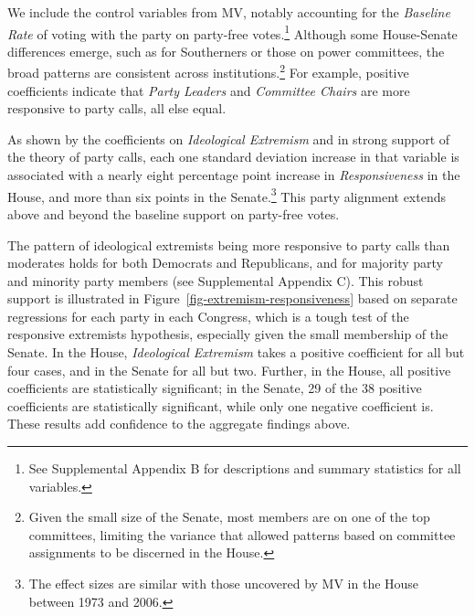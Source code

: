 \documentclass[12pt]{article}
\begin{document}
We include the control variables from MV, notably accounting for the \textit{Baseline Rate} of voting with the party on party-free votes.\footnote{\doublespacing\normalsize See Supplemental Appendix B for descriptions and summary statistics for all variables.}  Although some House-Senate differences emerge, such as for Southerners or those on power committees, the broad patterns are consistent across institutions.\footnote{\doublespacing\normalsize Given the small size of the Senate, most members are on one of the top committees, limiting the variance that allowed patterns based on committee assignments to be discerned in the House.}  For example, positive coefficients indicate that \textit{Party Leaders} and \textit{Committee Chairs} are more responsive to party calls, all else equal.

As shown by the coefficients on \textit{Ideological Extremism} and in strong support of the theory of party calls, each one standard deviation increase in that variable is associated with a nearly eight percentage point increase in \textit{Responsiveness} in the House, and more than six points in the Senate.\footnote{\doublespacing\normalsize The effect sizes are similar with those uncovered by MV in the House between 1973 and 2006.}  This party alignment extends above and beyond the baseline support on party-free votes.

The pattern of ideological extremists being more responsive to party calls than moderates holds for both Democrats and Republicans, and for majority party and minority party members (see Supplemental Appendix C). This robust support is illustrated in Figure~\ref{fig-extremism-responsiveness} based on separate regressions for each party in each Congress, which is a tough test of the responsive extremists hypothesis, especially given the small membership of the Senate. In the House, \textit{Ideological Extremism} takes a positive coefficient for all but four cases, and in the Senate for all but two. Further, in the House, all positive coefficients are statistically significant; in the Senate, 29 of the 38 positive coefficients are statistically significant, while only one negative coefficient is. These results add confidence to the aggregate findings above.
\end{document}
